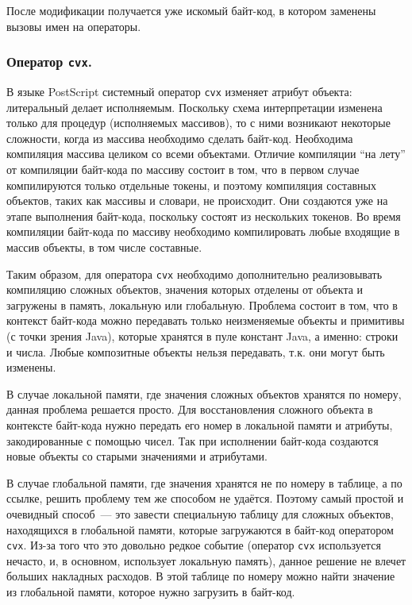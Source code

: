 	После модификации получается уже искомый байт-код, в котором  заменены вызовы имен на операторы.


	\subsubsection*{Оператор  \texttt{cvx}.}		
	В языке PostScript системный оператор \texttt{cvx} изменяет атрибут объекта: литеральный делает исполняемым. Поскольку схема интерпретации изменена только для процедур (исполняемых массивов), то с ними возникают некоторые сложности, когда из массива необходимо сделать байт-код. Необходима компиляция массива целиком со всеми объектами. Отличие компиляции ``на лету'' от компиляции байт-кода по массиву состоит в том, что в первом случае компилируются только отдельные токены, и поэтому компиляция составных объектов, таких как массивы и словари, не происходит.  Они создаются уже на этапе выполнения байт-кода, поскольку состоят из нескольких токенов. Во время компиляции байт-кода по массиву необходимо компилировать любые входящие в массив объекты, в том числе составные.
	
	Таким образом, для оператора \texttt{cvx} необходимо дополнительно реализовывать  компиляцию сложных объектов, значения которых отделены от объекта и загружены в память, локальную или глобальную. Проблема состоит в том, что в контекст байт-кода можно передавать только неизменяемые объекты и примитивы (с точки зрения Java), которые хранятся в пуле констант Java, а именно: строки и числа. Любые композитные объекты нельзя передавать, т.к. они могут быть изменены.
	
	В случае локальной памяти, где значения сложных объектов хранятся по номеру, данная проблема решается просто. Для восстановления сложного объекта в контексте байт-кода нужно передать его номер в локальной памяти и атрибуты, закодированные с помощью чисел. Так при исполнении байт-кода создаются новые объекты со старыми значениями и атрибутами.
	
	В случае глобальной памяти, где значения хранятся не по номеру в таблице, а по ссылке, решить проблему тем же способом не удаётся. Поэтому самый простой и очевидный способ~--- это завести специальную таблицу для сложных объектов, находящихся в глобальной памяти, которые загружаются в байт-код оператором \texttt{cvx}. Из-за того что это довольно редкое событие (оператор \texttt{cvx} используется нечасто, и, в основном, использует локальную память), данное решение не влечет больших накладных расходов. В этой таблице по номеру можно найти значение из глобальной памяти, которое нужно загрузить в байт-код.
	
